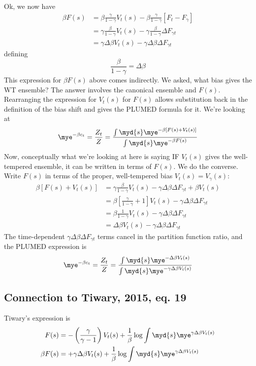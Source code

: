 \documentclass[twocolumn]{notes}
\begin{document}
Ok, we now have
\begin{align*}
    \beta F(s) &= \beta\frac{\gamma}{1-\gamma}V_t(s) - \beta\frac{\gamma}{1-\gamma}[F_t-F_\gamma] \\
    &= \gamma\frac{\beta}{1-\gamma}V_t(s) - \gamma\frac{\beta}{1-\gamma}\Delta F_{\gamma t} \\
    &= \gamma\Delta\beta V_t(s) - \gamma\Delta\beta \Delta F_{\gamma t}
\end{align*}
defining
\[
    \frac{\beta}{1-\gamma} = \Delta\beta
\]
This expression for $\beta F(s)$ above comes indirectly.  We asked, what bias gives the WT ensemble?  The answer involves the canonical ensemble and $F(s)$.  Rearranging the expression for $V_t(s)$ for $F(s)$ allows substitution back in the definition of the bias shift and gives the PLUMED formula for it.  We're looking at
\[
    \mye^{-\beta c_t} = \frac{Z_t}{Z} = \frac{\int\myd{s}\mye^{-\beta[F(s)+V_t(s)]}}{\int\myd{s}\mye^{-\beta F(s)}}
\]
Now, conceptually what we're looking at here is saying IF $V_t(s)$ gives the well-tempered ensemble, it can be written in terms of $F(s)$.  We do the converse.  Write $F(s)$ in terms of the proper, well-tempered bias $V_t(s) = V_\gamma(s)$:
\begin{align*}
    \beta[F(s)+V_t(s)] &= \gamma\frac{\beta}{1-\gamma}V_t(s) - \gamma\Delta\beta\Delta F_{\gamma t} + \beta V_t(s) \\
    &= \beta\left[\frac{\gamma}{1-\gamma}+1\right]V_t(s) - \gamma\Delta\beta\Delta F_{\gamma t} \\
    &= \beta \frac{1}{1-\gamma}V_t(s) - \gamma\Delta\beta\Delta F_{\gamma t} \\
    &= \Delta\beta V_t(s) - \gamma\Delta\beta\Delta F_{\gamma t}
\end{align*}
The time-dependent $\gamma\Delta\beta\Delta F_{\gamma t}$ terms cancel in the partition function ratio, and the PLUMED expression is
\[
    \mye^{-\beta c_t} = \frac{Z_t}{Z} = \frac{\int\myd{s}\mye^{-\Delta\beta V_t(s)}}{\int\myd{s}\mye^{-\gamma\Delta\beta V_t(s)}}
\]

\subsection{Connection to Tiwary, 2015, eq. 19}
Tiwary's expression is
\begin{align*}
    F(s) &= -\left(\frac{\gamma}{\gamma-1}\right)V_t(s) + \frac{1}{\beta}
    \log\int\myd{s}\mye^{\gamma\Delta\beta V_t(s)} \\
    \beta F(s) &= +\gamma\Delta\beta V_t(s) + \frac{1}{\beta}
    \log\int\myd{s}\mye^{\gamma\Delta\beta V_t(s)}
\end{align*}


\appendix


\end{document}
